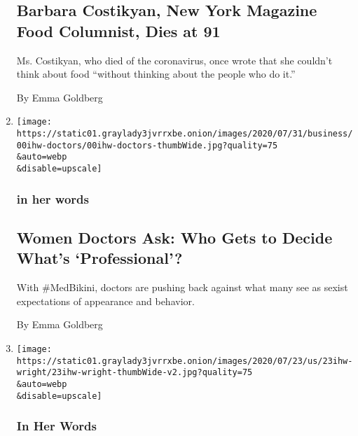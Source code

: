 \begin{enumerate}
  \hypertarget{barbara-costikyan-new-york-magazine-food-columnist-dies-at-91}{%
  \subsection{Barbara Costikyan, New York Magazine Food Columnist, Dies
  at
  91}\label{barbara-costikyan-new-york-magazine-food-columnist-dies-at-91}}

  Ms. Costikyan, who died of the coronavirus, once wrote that she
  couldn't think about food ``without thinking about the people who do
  it.''

  By Emma Goldberg
\item
  \href{/2020/08/02/us/women-doctors-medbikini-professional-gender-bias.html}{}

  \texttt{[image: https://static01.graylady3jvrrxbe.onion/images/2020/07/31/business/00ihw-doctors/00ihw-doctors-thumbWide.jpg?quality=75\\\&auto=webp\\\&disable=upscale]}

  \hypertarget{in-her-words}{%
  \subsubsection{in her words}\label{in-her-words}}

  \hypertarget{women-doctors-ask-who-gets-to-decide-whats-professional}{%
  \subsection{Women Doctors Ask: Who Gets to Decide What's
  `Professional'?}\label{women-doctors-ask-who-gets-to-decide-whats-professional}}

  With \#MedBikini, doctors are pushing back against what many see as
  sexist expectations of appearance and behavior.

  By Emma Goldberg
\item
  \href{/2020/07/24/us/climate-change-green-new-deal-covid-coronavirus.html}{}

  \texttt{[image: https://static01.graylady3jvrrxbe.onion/images/2020/07/23/us/23ihw-wright/23ihw-wright-thumbWide-v2.jpg?quality=75\\\&auto=webp\\\&disable=upscale]}

  \hypertarget{in-her-words-1}{%
  \subsubsection{In Her Words}\label{in-her-words-1}}

  \hypertarget{how-covid-19-made-it-easier-to-talk-about-climate-change}{%
}
\end{enumerate}
